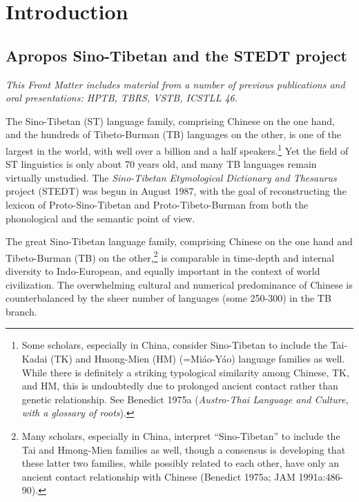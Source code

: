 \vspace{0.25em}


\renewcommand{\thefootnote}{\arabic{footnote}}
\setcounter{footnote}{0}

\chapter*{Introduction}

\section{Apropos Sino-Tibetan and the STEDT project}

\textit{This Front Matter includes material from a number of previous publications and oral presentations: HPTB, TBRS, VSTB, ICSTLL 46.}

The Sino-Tibetan (ST) language family, comprising Chinese on the one hand,
and the hundreds of Tibeto-Burman (TB) languages on the other, is one of the
largest in the world, with well over a billion and a half
speakers.\footnote{Some scholars, especially in China,
consider Sino-Tibetan to include the
Tai-Kadai (TK) and Hmong-Mien (HM) (=Mi\'ao-Y\'ao) language families as well.  While
there is definitely a striking typological similarity among Chinese, TK, and HM,
this is undoubtedly due to prolonged ancient contact rather than genetic
relationship.  See Benedict 1975a (\textit{Austro-Thai Language and Culture, with a
glossary of roots}).}  Yet the field of ST linguistics is only about 70 years
old, and many TB languages remain virtually unstudied.  The \textit{Sino-Tibetan
Etymological Dictionary and Thesaurus} project (STEDT) was begun in August 1987,
with the goal of reconstructing the lexicon of Proto-Sino-Tibetan and
Proto-Tibeto-Burman from both the phonological and the semantic point of view.

The great Sino-Tibetan language family, comprising Chinese on the one hand and Tibeto-Burman (TB) on the other,\footnote{Many scholars, especially in China, interpret “Sino-Tibetan” to include the Tai and Hmong-Mien families as well, though a consensus is developing that these latter two families, while possibly related to each other, have only an ancient contact relationship with Chinese (Benedict 1975a; JAM 1991a:486-90).} is comparable in time-depth and internal diversity to Indo-European, and equally important in the context of world civilization. The overwhelming cultural and numerical predominance of Chinese is counterbalanced by the sheer number of languages (some 250-300) in the TB branch.

